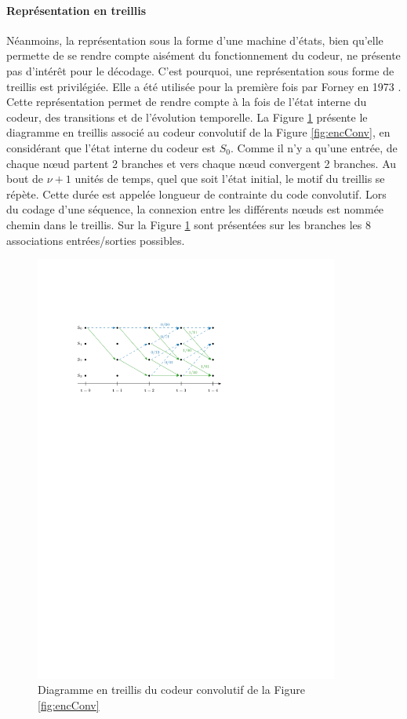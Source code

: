 \paragraph*{Représentation en treillis}
Néanmoins, la représentation sous la forme d'une machine d'états, bien qu'elle permette de se rendre compte aisément du fonctionnement du 
codeur, ne présente pas d’intérêt pour le décodage. C'est pourquoi, une représentation sous forme de treillis est privilégiée. Elle a
été utilisée pour la première fois par Forney en 1973 \cite{forney73viterbi}. Cette
représentation permet de rendre compte à la fois de l'état interne du codeur, des transitions et de l'évolution 
temporelle. La Figure \ref{fig:trellis} présente le diagramme en treillis associé au codeur convolutif de la Figure 
\ref{fig:encConv}, en considérant que l'état interne du codeur est $S_0$. Comme il n'y a qu'une entrée, de chaque nœud 
partent 2 branches et vers chaque nœud convergent 2 branches. Au bout de $\nu+1$ unités de temps, quel que soit l'état 
initial, le motif du treillis se répète. Cette durée est appelée longueur de contrainte du code convolutif. Lors du 
codage d'une séquence, la connexion entre les différents nœuds est nommée chemin dans le treillis. Sur la Figure  
\ref{fig:trellis} sont présentées sur les branches les 8 associations entrées/sorties possibles.
\begin{figure}[!h]
	\centering
	\includegraphics[width=10cm]{main/ch1_fig/trellis.pdf}
	\caption{\label{fig:trellis} Diagramme en treillis du codeur convolutif de la Figure \ref{fig:encConv}}
\end{figure}

